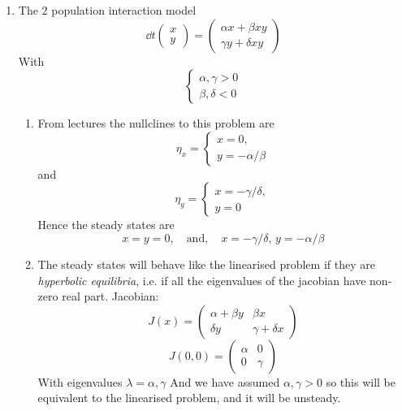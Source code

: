 \documentclass{/home/janmebows/Documents/LatexTemplates/myassignment}
\begin{document}
\begin{enumerate}
\begin{enumerate}
	\end{enumerate}
	\item The 2 population interaction model
	\[\dd{}t \begin{pmatrix}x\\y\end{pmatrix} = \begin{pmatrix}\alpha x + \beta xy\\ \gamma y + \delta xy\end{pmatrix}\]
	With
	\[\begin{cases}
		\alpha,\gamma > 0\\\beta,\delta < 0
	\end{cases}\]
	\begin{enumerate}
		\item %
				From lectures the nullclines to this problem are
				\[\eta_x = \begin{cases}
					x=0,\\ y=-\alpha/\beta
				\end{cases} \]
				and
				\[\eta_y = \begin{cases}x = -\gamma/\delta,\\  y=0\end{cases}\]
				Hence the steady states are
				\[x=y=0, \quad \text{and}, \quad x=-\gamma/\delta,\, y=-\alpha/\beta\]
		\item %
		The steady states will behave like the linearised problem if they are \textit{hyperbolic equilibria}, i.e. if all the eigenvalues of the jacobian have non-zero real part. 
		Jacobian:
		\[J(x) = \begin{pmatrix}
			\alpha + \beta y&\beta x\\ \delta y& \gamma + \delta x
		\end{pmatrix}\]
		\[J(0,0) = \begin{pmatrix}
			\alpha&0\\ 0&\gamma
		\end{pmatrix}\]
		With eigenvalues $\lambda = \alpha,\gamma$ And we have assumed $\alpha,\gamma > 0$ so this will be equivalent to the linearised problem, and it will be unsteady. 


\end{enumerate}
\end{enumerate}
\end{document}
